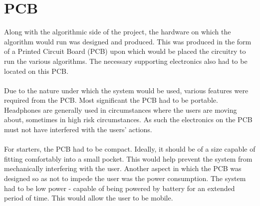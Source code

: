 \section{PCB}

Along with the algorithmic side of the project, the hardware on which the algorithm would run was designed and produced.
This was produced in the form of a Printed Circuit Board (PCB) upon which would be placed the circuitry to run the various algorithms.
The necessary supporting electronics also had to be located on this PCB.
\\
\\
Due to the nature under which the system would be used, various features were required from the PCB.
Most significant the PCB had to be portable.
Headphones are generally used in circumstances where the users are moving about, sometimes in high risk circumstances.
As such the electronics on the PCB must not have interfered with the users' actions.
\\
\\
For starters, the PCB had to be compact.
Ideally, it should be of a size capable of fitting comfortably into a small pocket.
This would help prevent the system from mechanically interfering with the user.
Another aspect in which the PCB was designed so as not to impede the user was the power consumption.
The system had to be low power - capable of being powered by battery for an extended period of time.
This would allow the user to be mobile.
